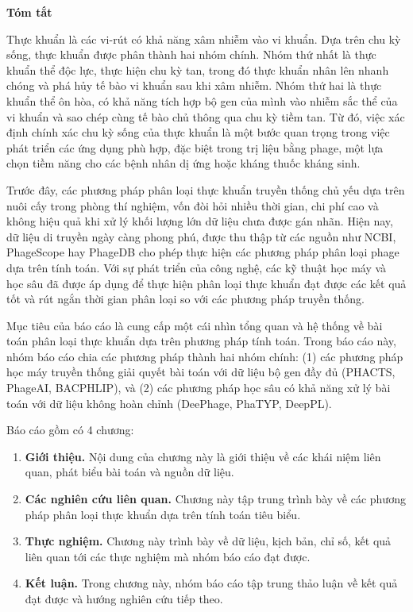\begin{center}
\textbf{\large{Tóm tắt}	}
\end{center}


\begin{small}
Thực khuẩn là các vi-rút có khả năng xâm nhiễm vào vi khuẩn. Dựa trên chu kỳ sống, thực khuẩn được phân thành hai nhóm chính. Nhóm thứ nhất là thực khuẩn thể độc lực, thực hiện chu kỳ tan, trong đó thực khuẩn nhân lên nhanh chóng và phá hủy tế bào vi khuẩn sau khi xâm nhiễm. Nhóm thứ hai là thực khuẩn thể ôn hòa, có khả năng tích hợp bộ gen của mình vào nhiễm sắc thể của vi khuẩn và sao chép cùng tế bào chủ thông qua chu kỳ tiềm tan. Từ đó, việc xác định chính xác chu kỳ sống của thực khuẩn là một bước quan trọng trong việc phát triển các ứng dụng phù hợp, đặc biệt trong trị liệu bằng phage, một lựa chọn tiềm năng cho các bệnh nhân dị ứng hoặc kháng thuốc kháng sinh.

Trước đây, các phương pháp phân loại thực khuẩn truyền thống chủ yếu dựa trên nuôi cấy trong phòng thí nghiệm, vốn đòi hỏi nhiều thời gian, chi phí cao và không hiệu quả khi xử lý khối lượng lớn dữ liệu chưa được gán nhãn. Hiện nay, dữ liệu di truyền ngày càng phong phú, được thu thập từ các nguồn như NCBI, PhageScope hay PhageDB cho phép thực hiện các phương pháp phân loại phage dựa trên tính toán. Với sự phát triển của công nghệ, các kỹ thuật học máy và học sâu đã được áp dụng để thực hiện phân loại thực khuẩn đạt được các kết quả tốt và rút ngắn thời gian phân loại so với các phương pháp truyền thống.

Mục tiêu của báo cáo là cung cấp một cái nhìn tổng quan và hệ thống về bài toán phân loại thực khuẩn dựa trên phương pháp tính toán. Trong báo cáo này, nhóm báo cáo chia các phương pháp thành hai nhóm chính: (1) các phương pháp học máy truyền thống giải quyết bài toán với dữ liệu bộ gen đầy đủ (PHACTS, PhageAI, BACPHLIP), và (2) các phương pháp học sâu có khả năng xử lý bài toán với dữ liệu không hoàn chỉnh (DeePhage, PhaTYP, DeepPL).

Báo cáo gồm có 4 chương:
\begin{enumerate}
    \item \textbf{Giới thiệu.} Nội dung của chương này là giới thiệu về các khái niệm liên quan, phát biểu bài toán và nguồn dữ liệu.
    \item \textbf{Các nghiên cứu liên quan.} Chương này tập trung trình bày về các phương pháp phân loại thực khuẩn dựa trên tính toán tiêu biểu.
    \item \textbf{Thực nghiệm.} Chương này trình bày về dữ liệu, kịch bản, chỉ số, kết quả liên quan tới các thực nghiệm mà nhóm báo cáo đạt được.
    \item \textbf{Kết luận.} Trong chương này, nhóm báo cáo tập trung thảo luận về kết quả đạt được và hướng nghiên cứu tiếp theo.
\end{enumerate}

\end{small}